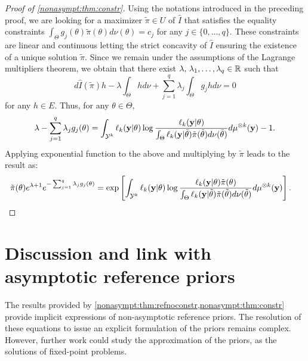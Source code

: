 \begin{proof}[Proof of \cref{nonasympt:thm:constr}]
    Using the notations introduced in the preceding proof, 
    we are looking for a maximizer $\tilde\pi\in U$ of $\hat I$ that satisfies the equality constraints $\int_\Theta g_j(\theta)\tilde\pi(\theta)d\nu(\theta)=c_j$ for any $j\in\{0,\dots,q\}$. These constraints are linear and continuous letting the strict concavity of $\hat I$ ensuring the existence of a unique solution $\tilde\pi$. Since we remain  under the assumptions of the Lagrange multipliers theorem, we obtain that there exist $\lambda,\,\lambda_1,\dots,\lambda_q\in\mathbb{R}$ such that
    \begin{equation}
        d\hat I(\tilde\pi)h -\lambda\int_\Theta hd\nu +\sum_{j=1}^q\lambda_j\int_\Theta g_jhd\nu=0
    \end{equation}
        for any $h\in E$. Thus, for any $\theta\in\Theta$,
            \begin{align}
                \lambda -\sum_{j=1}^q\lambda_jg_j(\theta)= \int_{\mathcal{Y}^k} \ell_k(\mathbf{y}|\theta)\log\frac{\ell_k(\mathbf{y}|\theta)}{\int_\Theta \ell_k(\mathbf{y}|\tilde\theta)\tilde\pi(\tilde\theta)d\nu(\tilde\theta)}d\mu^{\otimes k}(\mathbf{y}) - 1.
            \end{align}
        Applying exponential function to the above and multiplying by $\tilde\pi$ leads to the result as:
            \begin{align}
                \tilde\pi(\theta)e^{\lambda+1} e^{-\sum_{j=1}^q\lambda_jg_j(\theta)} &=  \exp\left[ \int_{\mathcal{Y}^k} \ell_k(\mathbf{y}|\theta)\log\frac{ \ell_k(\mathbf{y}|\theta)\tilde\pi(\theta)}{\int_\Theta \ell_k(\mathbf{y}|\tilde\theta)\tilde\pi(\tilde\theta)d\nu(\tilde\theta)}d\mu^{\otimes k}(\mathbf{y})\right].
            \end{align}
    
\end{proof}


\section{Discussion and link with asymptotic reference priors}
\label{nonasympt:sec:discussion}

The results provided by \cref{nonasympt:thm:refnoconstr,nonasympt:thm:constr} provide implicit expressions of non-asymptotic reference priors.
The resolution of these equations to issue an explicit formulation of the priors remains complex.
However, further work could study the approximation of the priors, as the solutions of fixed-point problems.


